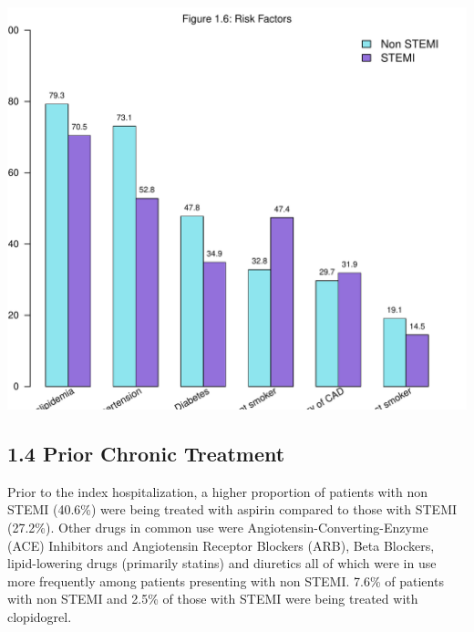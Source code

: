 \documentclass[
]{article}
\begin{document}
\includegraphics{‏‏ACSIS_2024_v1_pdf_without_files/figure-latex/unnamed-chunk-23-1.pdf}

\pagebreak

\subsection{1.4 Prior Chronic Treatment}\label{prior-chronic-treatment}

Prior to the index hospitalization, a higher proportion of patients with
non STEMI (40.6\%) were being treated with aspirin compared to those
with STEMI (27.2\%). Other drugs in common use were
Angiotensin-Converting-Enzyme (ACE) Inhibitors and Angiotensin Receptor
Blockers (ARB), Beta Blockers, lipid-lowering drugs (primarily statins)
and diuretics all of which were in use more frequently among patients
presenting with non STEMI. 7.6\% of patients with non STEMI and 2.5\% of
those with STEMI were being treated with clopidogrel.

~
\end{document}
